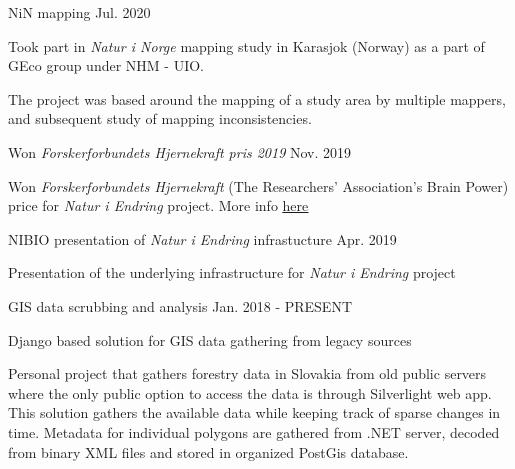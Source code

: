 
\begin{cventries}
  \cventry
    {} %
    {NiN mapping} %
    {} %
    {Jul. 2020} %
    {
      \begin{cvitems} %
        \item {Took part in \textit{Natur i Norge} mapping study in Karasjok (Norway) as a part of GEco group under NHM - UIO.}
		\item {The project was based around the mapping of a study area by multiple mappers, and subsequent study of mapping inconsistencies.}
      \end{cvitems}
    }
    \cventry
    {} %
    {Won \textit{Forskerforbundets Hjernekraft pris 2019}} %
    {} %
    {Nov. 2019} %
    {
      \begin{cvitems} %
        \item {Won \textit{Forskerforbundets Hjernekraft} (The Researchers' Association's Brain Power) price for \textit{Natur i Endring} project. More info \underline{\href{https://www.mn.uio.no/geo/om/aktuelt/aktuelle-saker/2019/hjernekraft-prisen2019.html}{here}}}
      \end{cvitems}
    }
  \cventry
    {} %
    {NIBIO presentation of \textit{Natur i Endring} infrastucture} %
    {} %
    {Apr. 2019} %
    {
      \begin{cvitems} %
        \item {Presentation of the underlying infrastructure for \textit{Natur i Endring} project}
      \end{cvitems}
    }
  \cventry
    {} %
    {GIS data scrubbing and analysis} %
    {} %
    {Jan. 2018 - PRESENT} %
    {
      \begin{cvitems} %
        \item {Django based solution for GIS data gathering from legacy sources}
		\item {Personal project that gathers forestry data in Slovakia from old public servers where the only public option to access the data is through \mbox{Silverlight} web app. This solution gathers the available data while keeping track of sparse changes in time. Metadata for individual polygons are gathered from .NET server, decoded from binary XML files and stored in organized \mbox{PostGis} database.}
      \end{cvitems}
    }
    

\end{cventries}
